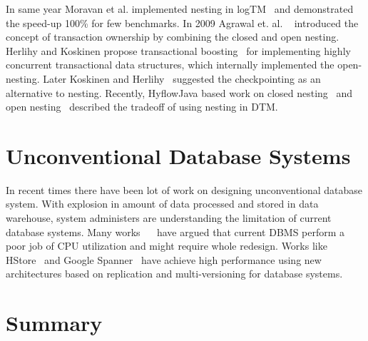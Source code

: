 \documentclass[12pt,english]{report}
\begin{document}
In same year Moravan et al. implemented nesting in logTM~\cite{moravan2006supporting} and demonstrated the speed-up 100\% for few benchmarks. In 2009 Agrawal et. al. ~\cite{agrawal2009safe} introduced the concept of transaction ownership by combining the closed and open nesting. Herlihy and Koskinen propose transactional boosting~\cite{herlihy2008transactional} for implementing highly concurrent transactional data structures, which internally implemented the open-nesting. Later Koskinen and Herlihy~\cite{koskinen2008checkpoints} suggested the checkpointing as an alternative to nesting. Recently, HyflowJava based work on closed nesting~\cite{turcu2012closed} and open nesting~\cite{turcu2012open} described the tradeoff of using nesting in DTM. 

\section{Unconventional Database Systems}
In recent times there have been lot of work on designing unconventional database system. With explosion in amount of data processed and stored in data warehouse, system administers are understanding the limitation of current database systems. Many works ~\cite{Stonebraker:2007:EAE:1325851.1325981}~\cite{harizopoulos2008oltp} have argued that current DBMS perform a poor job of CPU utilization and might require whole redesign. Works like HStore~\cite{HSTORE:kallman2008h} and Google Spanner~\cite{corbett2012spanner} have achieve high performance using new architectures based on replication and multi-versioning for database systems. 

\section{Summary}
\end{document}
